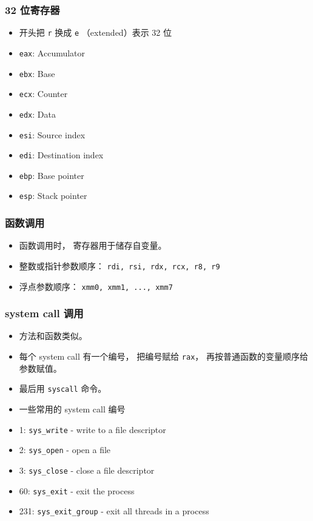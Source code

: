 \subsubsection{32 位寄存器}
\begin{itemize}
\item 开头把 \verb`r` 换成 \verb`e` （extended）表示 32 位
\item \verb`eax`: Accumulator
\item \verb`ebx`: Base
\item \verb`ecx`: Counter
\item \verb`edx`: Data
\item \verb`esi`: Source index
\item \verb`edi`: Destination index
\item \verb`ebp`: Base pointer
\item \verb`esp`: Stack pointer
\end{itemize}

\subsubsection{函数调用}
\begin{itemize}
\item 函数调用时， 寄存器用于储存自变量。
\item 整数或指针参数顺序： \verb`rdi, rsi, rdx, rcx, r8, r9`
\item 浮点参数顺序： \verb`xmm0, xmm1, ..., xmm7`
\end{itemize}

\subsubsection{system call 调用}
\begin{itemize}
\item 方法和函数类似。
\item 每个 system call 有一个编号， 把编号赋给 \verb`rax`， 再按普通函数的变量顺序给参数赋值。
\item 最后用 \verb`syscall` 命令。
\item 一些常用的 system call 编号
\item 1: \verb`sys_write` - write to a file descriptor
\item 2: \verb`sys_open` - open a file
\item 3: \verb`sys_close` - close a file descriptor
\item 60: \verb`sys_exit` - exit the process
\item 231: \verb`sys_exit_group` - exit all threads in a process
\end{itemize}

